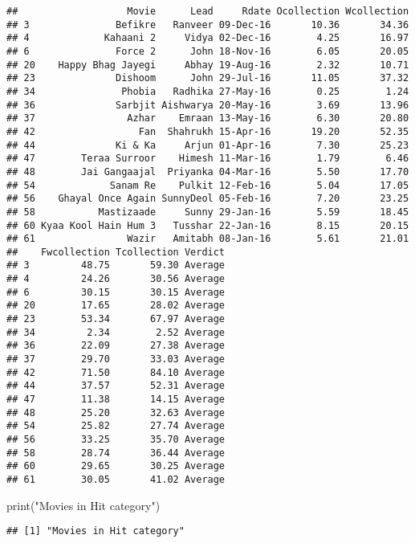 \documentclass[
]{article}
\newenvironment{Shaded}{\begin{snugshade}}{\end{snugshade}}
\newcommand{\FunctionTok}[1]{\textcolor[rgb]{0.00,0.00,0.00}{#1}}
\newcommand{\NormalTok}[1]{#1}
\newcommand{\StringTok}[1]{\textcolor[rgb]{0.31,0.60,0.02}{#1}}
\begin{document}
\begin{verbatim}
##                   Movie      Lead     Rdate Ocollection Wcollection
## 3               Befikre   Ranveer 09-Dec-16       10.36       34.36
## 4             Kahaani 2     Vidya 02-Dec-16        4.25       16.97
## 6               Force 2      John 18-Nov-16        6.05       20.05
## 20    Happy Bhag Jayegi     Abhay 19-Aug-16        2.32       10.71
## 23              Dishoom      John 29-Jul-16       11.05       37.32
## 34               Phobia   Radhika 27-May-16        0.25        1.24
## 36              Sarbjit Aishwarya 20-May-16        3.69       13.96
## 37                Azhar    Emraan 13-May-16        6.30       20.80
## 42                  Fan  Shahrukh 15-Apr-16       19.20       52.35
## 44              Ki & Ka     Arjun 01-Apr-16        7.30       25.23
## 47        Teraa Surroor    Himesh 11-Mar-16        1.79        6.46
## 48        Jai Gangaajal  Priyanka 04-Mar-16        5.50       17.70
## 54             Sanam Re    Pulkit 12-Feb-16        5.04       17.05
## 56    Ghayal Once Again SunnyDeol 05-Feb-16        7.20       23.25
## 58           Mastizaade     Sunny 29-Jan-16        5.59       18.45
## 60 Kyaa Kool Hain Hum 3   Tusshar 22-Jan-16        8.15       20.15
## 61                Wazir   Amitabh 08-Jan-16        5.61       21.01
##    Fwcollection Tcollection Verdict
## 3         48.75       59.30 Average
## 4         24.26       30.56 Average
## 6         30.15       30.15 Average
## 20        17.65       28.02 Average
## 23        53.34       67.97 Average
## 34         2.34        2.52 Average
## 36        22.09       27.38 Average
## 37        29.70       33.03 Average
## 42        71.50       84.10 Average
## 44        37.57       52.31 Average
## 47        11.38       14.15 Average
## 48        25.20       32.63 Average
## 54        25.82       27.74 Average
## 56        33.25       35.70 Average
## 58        28.74       36.44 Average
## 60        29.65       30.25 Average
## 61        30.05       41.02 Average
\end{verbatim}

\begin{Shaded}
\begin{Highlighting}[]
\FunctionTok{print}\NormalTok{(}\StringTok{"Movies in Hit category"}\NormalTok{)}
\end{Highlighting}
\end{Shaded}

\begin{verbatim}
## [1] "Movies in Hit category"
\end{verbatim}
\end{document}
